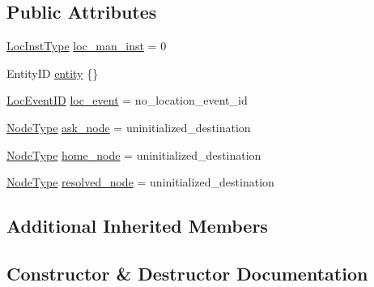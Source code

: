 \subsection*{Public Attributes}
\begin{DoxyCompactItemize}
\item 
\hyperlink{namespacevt_1_1location_a4db6456e8024af2d23fc5ae560fef866}{Loc\+Inst\+Type} \hyperlink{structvt_1_1location_1_1_location_msg_ad685e327f058d12836ed9743d44b14b7}{loc\+\_\+man\+\_\+inst} = 0
\item 
Entity\+ID \hyperlink{structvt_1_1location_1_1_location_msg_ab87a163a9f9f15780898870e0cba9b0e}{entity} \{\}
\item 
\hyperlink{namespacevt_1_1location_aa5ccc1a42aa22b0b41fcfbbdee314dca}{Loc\+Event\+ID} \hyperlink{structvt_1_1location_1_1_location_msg_a9550d842c2e1dcd3a5c48675c6b5c080}{loc\+\_\+event} = no\+\_\+location\+\_\+event\+\_\+id
\item 
\hyperlink{namespacevt_a866da9d0efc19c0a1ce79e9e492f47e2}{Node\+Type} \hyperlink{structvt_1_1location_1_1_location_msg_ab99a70172011e251d4abec4f2110fc08}{ask\+\_\+node} = uninitialized\+\_\+destination
\item 
\hyperlink{namespacevt_a866da9d0efc19c0a1ce79e9e492f47e2}{Node\+Type} \hyperlink{structvt_1_1location_1_1_location_msg_a66a5eb7dc3383f583b04d2ecf66c7222}{home\+\_\+node} = uninitialized\+\_\+destination
\item 
\hyperlink{namespacevt_a866da9d0efc19c0a1ce79e9e492f47e2}{Node\+Type} \hyperlink{structvt_1_1location_1_1_location_msg_a4c047bbd95901a1543e17e7924e1d2d3}{resolved\+\_\+node} = uninitialized\+\_\+destination
\end{DoxyCompactItemize}
\subsection*{Additional Inherited Members}


\subsection{Constructor \& Destructor Documentation}
\mbox{\label{structvt_1_1location_1_1_location_msg_af1b76aa81c81ed8ed2a9c9db4e5cff45}} 
